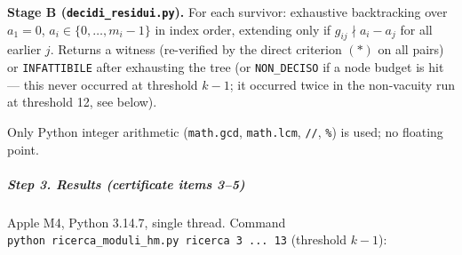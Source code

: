 \textbf{Stage B (\texttt{decidi\_residui.py}).} For each survivor:
exhaustive backtracking over \(a_1=0\), \(a_i\in\{0,\dots,m_i-1\}\) in
index order, extending only if \(g_{ij}\nmid a_i-a_j\) for all earlier
\(j\). Returns a witness (re-verified by the direct criterion \((*)\) on
all pairs) or \texttt{INFATTIBILE} after exhausting the tree (or
\texttt{NON\_DECISO} if a node budget is hit --- this never occurred at
threshold \(k-1\); it occurred twice in the non-vacuity run at threshold
12, see below).

Only Python integer arithmetic (\texttt{math.gcd}, \texttt{math.lcm},
\texttt{//}, \texttt{\%}) is used; no floating point.

\subparagraph{Step 3. Results (certificate items
3--5)}\label{step-3.-results-certificate-items-35}

Apple M4, Python 3.14.7, single thread. Command
\texttt{python\ ricerca\_moduli\_hm.py\ ricerca\ 3\ ...\ 13} (threshold
\(k-1\)):


